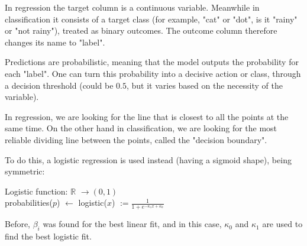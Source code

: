 \par
In regression the target column is a continuous variable. Meanwhile in
classification it consists of a target class (for example, "cat" or "dot", is it
"rainy" or "not rainy"), treated as binary outcomes. The outcome column
therefore changes its name to "label".

\par
Predictions are probabilistic, meaning that the model outputs the probability
for each "label". One can turn this probability into a decisive action or class,
through a decision threshold (could be $0.5$, but it varies based on the
necessity of the variable).

\par
In regression, we are looking for the line that is closest to all the points at
the same time. On the other hand in classification, we are looking for the most
reliable dividing line between the points, called the "decision boundary".

\par
To do this, a logistic regression is used instead (having a sigmoid shape),
being symmetric:


\begin{center}
	Logistic function: $\mathbb{R}$               $\rightarrow (0,1)$ \\
	probabilities($p$) $\leftarrow$ logistic($x$) $:= \frac{1}{1 + e^{-\kappa_1x +
					\kappa_0}}$
\end{center}

\par
Before, $\beta_i$ was found for the best linear fit, and in this case,
$\kappa_0$ and $\kappa_1$ are used to find the best logistic fit.
